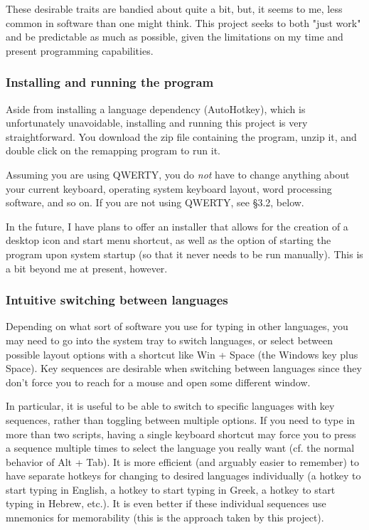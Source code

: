 \documentclass[11pt]{article}
\begin{document}
These desirable traits are bandied about quite a bit, but, it seems to me, less common in software than one might think. This project seeks to both "just work" and be predictable as much as possible, given the limitations on my time and present programming capabilities.

\subsubsection{Installing and running the program}
\label{sec:org49fb3cd}

Aside from installing a language dependency (AutoHotkey), which is unfortunately unavoidable, installing and running this project is very straightforward. You download the zip file containing the program, unzip it, and double click on the remapping program to run it.

Assuming you are using QWERTY, you do \emph{not} have to change anything about your current keyboard, operating system keyboard layout, word processing software, and so on. If you are not using QWERTY, see §3.2, below.

In the future, I have plans to offer an installer that allows for the creation of a desktop icon and start menu shortcut, as well as the option of starting the program upon system startup (so that it never needs to be run manually). This is a bit beyond me at present, however.

\subsubsection{Intuitive switching between languages}
\label{sec:org676f94a}

Depending on what sort of software you use for typing in other languages, you may need to go into the system tray to switch languages, or select between possible layout options with a shortcut like Win + Space (the Windows key plus Space). Key sequences are desirable when switching between languages since they don't force you to reach for a mouse and open some different window.

In particular, it is useful to be able to switch to specific languages with key sequences, rather than toggling between multiple options. If you need to type in more than two scripts, having a single keyboard shortcut may force you to press a sequence multiple times to select the language you really want (cf. the normal behavior of Alt + Tab). It is more efficient (and arguably easier to remember) to have separate hotkeys for changing to desired languages individually (a hotkey to start typing in English, a hotkey to start typing in Greek, a hotkey to start typing in Hebrew, etc.). It is even better if these individual sequences use mnemonics for memorability (this is the approach taken by this project).
\end{document}
